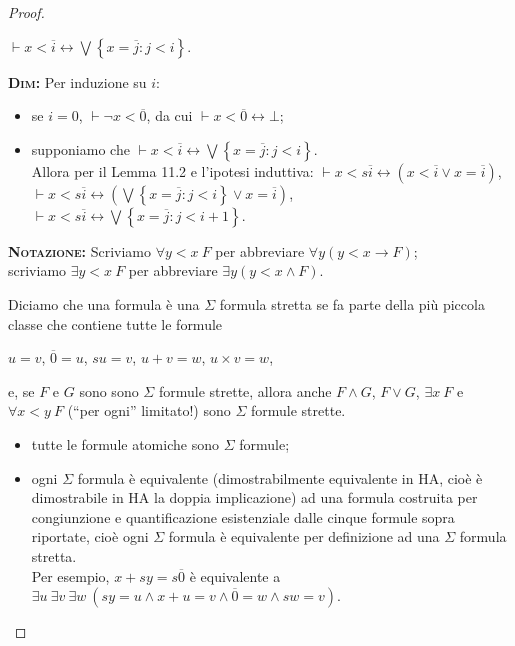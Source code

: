 \begin{proof}
\begin{description}
\begin{prop}
$\vdash x<\overline {i} \leftrightarrow \bigvee \left\{x=\overline j: j<i\right\}$.
\end{prop}

\textsc{\textbf{Dim:}} Per induzione su $i$:
\begin{itemize}
\item se $i=0$, $\vdash \neg x<\overline 0$, da cui $\vdash x<\overline 0 \leftrightarrow \bot$;
\item supponiamo che $\vdash x<\overline i\leftrightarrow \bigvee \left\{x=\overline j: j<i\right\}$.\\
Allora per il Lemma 11.2 e l'ipotesi induttiva:
$\vdash x<s\overline i\leftrightarrow \left(x<\overline i \vee x=\overline i\right)$,\\
$\vdash x<s\overline i\leftrightarrow \left(\bigvee \left\{x=\overline j: j<i\right\}\vee x=\overline i\right)$,\\
$\vdash x<s\overline i\leftrightarrow \bigvee \left\{x=\overline j: j<i+1\right\}$.\\
\end{itemize}

\textsc{\textbf{Notazione:}} Scriviamo $\forall y<x\ F$ per abbreviare $\forall y \left(y<x\rightarrow F\right)$;\\
scriviamo $\exists y<x\ F$ per abbreviare $\exists y \left(y<x\wedge F\right)$.\\

\begin{defi}
Diciamo che una formula è una $\Sigma$ formula stretta se fa parte della più piccola classe che contiene tutte le formule
\begin{center}
$u=v$, $\overline 0=u$, $su=v$, $u+v=w$, $u\times v=w$,
\end{center}
e, se $F$ e $G$ sono sono $\Sigma$ formule strette, allora anche $F\wedge G$, $F\vee G$, $\exists x\ F$ e $\forall x<y\ F$ ("`per ogni"' limitato!) sono $\Sigma$ formule strette.\\
\end{defi}

\begin{oss}
\begin{itemize}
	\item tutte le formule atomiche sono $\Sigma$ formule;
	\item ogni $\Sigma$ formula è equivalente (dimostrabilmente equivalente in HA, cioè è dimostrabile in HA la doppia implicazione) ad una formula costruita per congiunzione e quantificazione esistenziale dalle cinque formule sopra riportate, cioè ogni $\Sigma$ formula è equivalente per de\-fi\-ni\-zio\-ne ad una $\Sigma$ formula stretta.\\
Per esempio, $x+sy=s\overline 0$ è equivalente a\\
$\exists u\ \exists v\ \exists w\ \left(sy=u \wedge x+u=v \wedge \overline 0=w \wedge sw=v\right)$.\\
\end{itemize}
\end{oss}


\end{description}
\end{proof}
